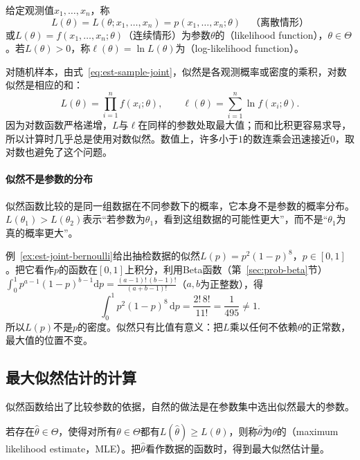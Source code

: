\begin{definition}[似然函数]
\label{def:est-likelihood}
给定观测值$x_1,\dots,x_n$，称
\[
L(\theta)=L(\theta;x_1,\dots,x_n)=p(x_1,\dots,x_n;\theta)\quad\text{（离散情形）}
\]
或$L(\theta)=f(x_1,\dots,x_n;\theta)$（连续情形）为参数$\theta$的（likelihood function），$\theta\in\Theta$。若$L(\theta)>0$，称$\ell(\theta)=\ln L(\theta)$为（log-likelihood function）。
\end{definition}

对随机样本，由式~\eqref{eq:est-sample-joint}，似然是各观测概率或密度的乘积，对数似然是相应的和：
\begin{equation}
\label{eq:est-log-likelihood}
L(\theta)=\prod_{i=1}^n f(x_i;\theta),\qquad
\ell(\theta)=\sum_{i=1}^n\ln f(x_i;\theta) .
\end{equation}
因为对数函数严格递增，$L$与$\ell$在同样的参数处取最大值；而和比积更容易求导，所以计算时几乎总是使用对数似然。数值上，许多小于$1$的数连乘会迅速接近$0$，取对数也避免了这个问题。

\paragraph{似然不是参数的分布}
似然函数比较的是同一组数据在不同参数下的概率，它本身不是参数的概率分布。$L(\theta_1)>L(\theta_2)$表示“若参数为$\theta_1$，看到这组数据的可能性更大”，而不是“$\theta_1$为真的概率更大”。

\begin{example}[似然的积分不为一]
\label{ex:est-likelihood-not-density}
例~\ref{ex:est-joint-bernoulli}给出抽检数据的似然$L(p)=p^2(1-p)^8$，$p\in[0,1]$。把它看作$p$的函数在$[0,1]$上积分，利用Beta函数（第~\ref{sec:prob-beta}节）$\int_0^1p^{a-1}(1-p)^{b-1}\mathrm{d}p=\frac{(a-1)!\,(b-1)!}{(a+b-1)!}$（$a,b$为正整数），得
\[
\int_0^1p^2(1-p)^8\,\mathrm{d}p=\frac{2!\,8!}{11!}=\frac{1}{495}\neq1 .
\]
所以$L(p)$不是$p$的密度。似然只有比值有意义：把$L$乘以任何不依赖$\theta$的正常数，最大值的位置不变。
\end{example}

\subsection{最大似然估计的计算}

似然函数给出了比较参数的依据，自然的做法是在参数集中选出似然最大的参数。

\begin{definition}[最大似然估计]
\label{def:est-mle}
若存在$\hat\theta\in\Theta$，使得对所有$\theta\in\Theta$都有$L(\hat\theta)\ge L(\theta)$，则称$\hat\theta$为$\theta$的（maximum likelihood estimate，MLE）。把$\hat\theta$看作数据的函数时，得到最大似然估计量。
\end{definition}

